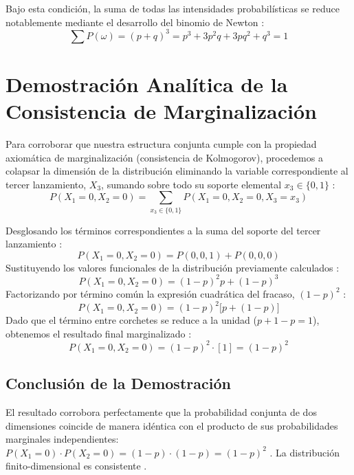 Bajo esta condición, la suma de todas las intensidades probabilísticas se reduce notablemente mediante el desarrollo del binomio de Newton :
\begin{equation}
    \sum P(\omega) = (p+q)^3 = p^3 + 3p^2q + 3pq^2 + q^3 = 1 
    \label{eq:binomio}
\end{equation}


\section{Demostración Analítica de la Consistencia de Marginalización}

Para corroborar que nuestra estructura conjunta cumple con la propiedad axiomática de marginalización (consistencia de Kolmogorov), procedemos a colapsar la dimensión de la distribución eliminando la variable correspondiente al tercer lanzamiento, $X_3$, sumando sobre todo su soporte elemental $x_3 \in \{0, 1\}$ :
\begin{equation}
    P(X_1 = 0, X_2 = 0) = \sum_{x_3 \in \{0,1\}} P(X_1 = 0, X_2 = 0, X_3 = x_3) 
\end{equation}

Desglosando los términos correspondientes a la suma del soporte del tercer lanzamiento :
\begin{equation}
    P(X_1 = 0, X_2 = 0) = P(0,0,1) + P(0,0,0) 
\end{equation}
Sustituyendo los valores funcionales de la distribución previamente calculados :
\begin{equation}
    P(X_1 = 0, X_2 = 0) = (1-p)^2 p + (1-p)^3 
\end{equation}
Factorizando por término común la expresión cuadrática del fracaso, $(1-p)^2$ :
\begin{equation}
    P(X_1 = 0, X_2 = 0) = (1-p)^2 \big[ p + (1-p) \big] 
\end{equation}
Dado que el término entre corchetes se reduce a la unidad ($p + 1 - p = 1$), obtenemos el resultado final marginalizado :
\begin{equation}
    P(X_1 = 0, X_2 = 0) = (1-p)^2 \cdot [1] = (1-p)^2 
\end{equation}

\subsection*{Conclusión de la Demostración}
El resultado corrobora perfectamente que la probabilidad conjunta de dos dimensiones coincide de manera idéntica con el producto de sus probabilidades marginales independientes: $P(X_1 = 0) \cdot P(X_2 = 0) = (1-p) \cdot (1-p) = (1-p)^2$ . La distribución finito-dimensional es consistente .

